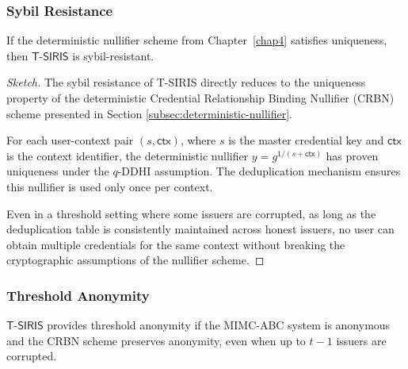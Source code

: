 \subsubsection{Sybil Resistance}

\begin{theorem}
If the deterministic nullifier scheme from Chapter~\ref{chap4} satisfies uniqueness, then $\mathsf{T\text{-}SIRIS}$ is sybil-resistant.
\end{theorem}

\begin{proof}[Sketch]
The sybil resistance of T-SIRIS directly reduces to the uniqueness property of the deterministic Credential Relationship Binding Nullifier (CRBN) scheme presented in Section \ref{subsec:deterministic-nullifier}. 

For each user-context pair $(s, \mathsf{ctx})$, where $s$ is the master credential key and $\mathsf{ctx}$ is the context identifier, the deterministic nullifier $y = g^{1/(s + \mathsf{ctx})}$ has proven uniqueness under the $q$-DDHI assumption. The deduplication mechanism ensures this nullifier is used only once per context.

Even in a threshold setting where some issuers are corrupted, as long as the deduplication table is consistently maintained across honest issuers, no user can obtain multiple credentials for the same context without breaking the cryptographic assumptions of the nullifier scheme.
\end{proof}

\subsubsection{Threshold Anonymity}

\begin{theorem}
$\mathsf{T\text{-}SIRIS}$ provides threshold anonymity if the MIMC-ABC system is anonymous and the CRBN scheme preserves anonymity, even when up to $t-1$ issuers are corrupted.
\end{theorem}

